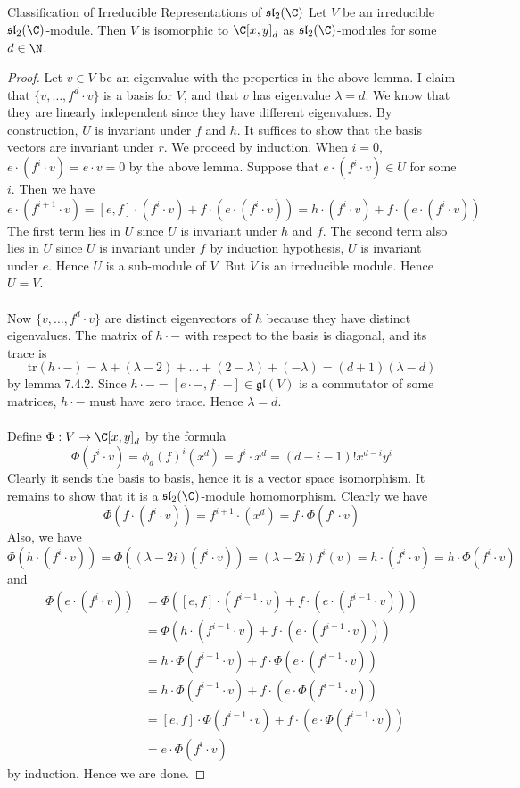 \documentclass[a4paper]{article}
\begin{document}
\begin{thm}{Classification of Irreducible Representations of $\mathfrak{sl}_2(\C)$}{} Let $V$ be an irreducible $\mathfrak{sl}_2(\C)$-module. Then $V$ is isomorphic to $\C[x,y]_d$ as $\mathfrak{sl}_2(\C)$-modules for some $d\in\N$. \tcbline
\begin{proof}
Let $v\in V$ be an eigenvalue with the properties in the above lemma. I claim that $\{v,\dots,f^d\cdot v\}$ is a basis for $V$, and that $v$ has eigenvalue $\lambda=d$. We know that they are linearly independent since they have different eigenvalues. By construction, $U$ is invariant under $f$ and $h$. It suffices to show that the basis vectors are invariant under $r$. We proceed by induction. When $i=0$, $e\cdot (f^i\cdot v)=e\cdot v=0$ by the above lemma. Suppose that $e\cdot(f^i\cdot v)\in U$ for some $i$. Then we have $$e\cdot(f^{i+1}\cdot v)=[e,f]\cdot(f^i\cdot v)+f\cdot(e\cdot(f^i\cdot v))=h\cdot (f^i\cdot v)+f\cdot (e\cdot (f^i\cdot v))$$ The first term lies in $U$ since $U$ is invariant under $h$ and $f$. The second term also lies in $U$ since $U$ is invariant under $f$ by induction hypothesis, $U$ is invariant under $e$. Hence $U$ is a sub-module of $V$. But $V$ is an irreducible module. Hence $U=V$. \\~\\

Now $\{v,\dots,f^d\cdot v\}$ are distinct eigenvectors of $h$ because they have distinct eigenvalues. The matrix of $h\cdot-$ with respect to the basis is diagonal, and its trace is $$\text{tr}(h\cdot -)=\lambda+(\lambda-2)+\dots+(2-\lambda)+(-\lambda)=(d+1)(\lambda-d)$$ by lemma 7.4.2. Since $h\cdot -=[e\cdot-,f\cdot-]\in\mathfrak{gl}(V)$ is a commutator of some matrices, $h\cdot-$ must have zero trace. Hence $\lambda=d$. \\~\\

Define $\Phi:V\to\C[x,y]_d$ by the formula $$\Phi(f^i\cdot v)=\phi_d(f)^i(x^d)=f^i\cdot x^d=(d-i-1)!x^{d-i}y^i$$ Clearly it sends the basis to basis, hence it is a vector space isomorphism. It remains to show that it is a $\mathfrak{sl}_2(\C)$-module homomorphism. Clearly we have $$\Phi(f\cdot(f^i\cdot v))=f^{i+1}\cdot(x^d)=f\cdot\Phi(f^i\cdot v)$$ Also, we have $$\Phi(h\cdot (f^i\cdot v))=\Phi((\lambda-2i)(f^i\cdot v))=(\lambda-2i)f^i(v)=h\cdot(f^i\cdot v)=h\cdot\Phi(f^i\cdot v)$$ and 
\begin{align*}
\Phi(e\cdot(f^i\cdot v))&=\Phi([e,f]\cdot(f^{i-1}\cdot v)+f\cdot(e\cdot (f^{i-1}\cdot v)))\\
&=\Phi(h\cdot(f^{i-1}\cdot v)+f\cdot(e\cdot (f^{i-1}\cdot v)))\\
&=h\cdot\Phi(f^{i-1}\cdot v)+f\cdot\Phi(e\cdot(f^{i-1}\cdot v))\\
&=h\cdot\Phi(f^{i-1}\cdot v)+f\cdot(e\cdot\Phi(f^{i-1}\cdot v))\tag{Induction}\\
&=[e,f]\cdot\Phi(f^{i-1}\cdot v)+f\cdot(e\cdot\Phi(f^{i-1}\cdot v))\\
&=e\cdot\Phi(f^i\cdot v)
\end{align*}
by induction. Hence we are done. 
\end{proof}
\end{thm}
\end{document}

